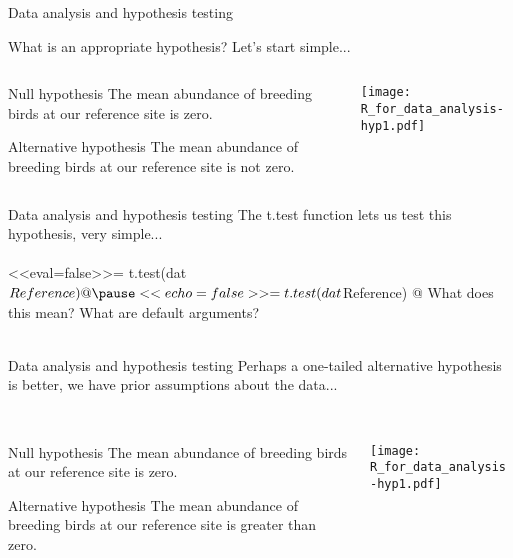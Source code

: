 \documentclass[xcolor=svgnames]{beamer}
\begin{document}
\begin{frame}{Data analysis and hypothesis testing}
\centerline{What is an appropriate hypothesis? Let's start simple...}
\vspace{0.2in}
\pause
\begin{columns}
\begin{column}{0.5\textwidth}
\begin{block}{Null hypothesis}
The mean abundance of breeding birds at our reference site is zero.
\end{block}
\pause
\vspace{0.2in}
\begin{block}{Alternative hypothesis}
The mean abundance of breeding birds at our reference site is not zero.
\end{block}
\end{column}
\begin{column}{0.5\textwidth}
\pause
\centerline{\texttt{[image: R\_for\_data\_analysis-hyp1.pdf]}}
\end{column}
\end{columns}
\end{frame}

\begin{frame}[t,fragile]{Data analysis and hypothesis testing}
The t.test function lets us test this hypothesis, very simple...\\~\\
<<eval=false>>=
t.test(dat$Reference)
@
\pause
\small
<<echo=false>>=
t.test(dat$Reference)
@
\normalsize
\vspace{0.2in}
\pause
What does this mean? \pause What are default arguments?\\~\\
\end{frame}

\begin{frame}[t]{Data analysis and hypothesis testing}
Perhaps a one-tailed alternative hypothesis is better, we have prior assumptions about the data...\\~\\
\pause
\begin{columns}
\begin{column}{0.5\textwidth}
\begin{block}{Null hypothesis}
The mean abundance of breeding birds at our reference site is zero.
\end{block}
\pause
\vspace{0.2in}
\begin{block}{Alternative hypothesis}
The mean abundance of breeding birds at our reference site is greater than zero.
\end{block}
\end{column}
\begin{column}{0.5\textwidth}
\pause
\centerline{\texttt{[image: R\_for\_data\_analysis-hyp1.pdf]}}
\end{column}
\end{columns}
\end{frame}
\end{document}
